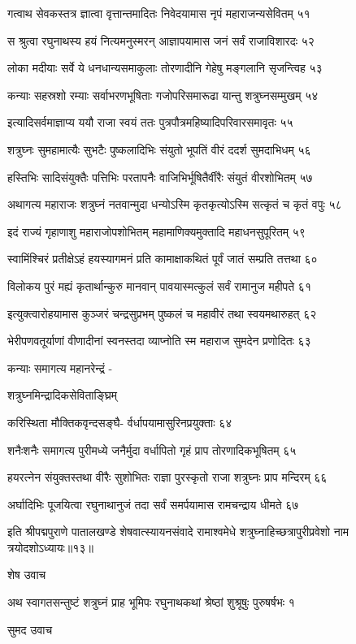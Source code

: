 गत्वाथ सेवकस्तत्र ज्ञात्वा वृत्तान्तमादितः
निवेदयामास नृपं महाराजन्यसेवितम् ५१

स श्रुत्वा रघुनाथस्य हयं नित्यमनुस्मरन्
आज्ञापयामास जनं सर्वं राजाविशारदः ५२

लोका मदीयाः सर्वे ये धनधान्यसमाकुलाः
तोरणादीनि गेहेषु मङ्गलानि सृजन्त्विह ५३

कन्याः सहस्रशो रम्याः सर्वाभरणभूषिताः
गजोपरिसमारूढा यान्तु शत्रुघ्नसम्मुखम् ५४

इत्यादिसर्वमाज्ञाप्य ययौ राजा स्वयं ततः
पुत्रपौत्रमहिष्यादिपरिवारसमावृतः ५५

शत्रुघ्नः सुमहामात्यैः सुभटैः पुष्कलादिभिः
संयुतो भूपतिं वीरं ददर्श सुमदाभिधम् ५६

हस्तिभिः सादिसंयुक्तैः पत्तिभिः परतापनैः
वाजिभिर्भूषितैर्वीरैः संयुतं वीरशोभितम् ५७

अथागत्य महाराजः शत्रुघ्नं नतवान्मुदा
धन्योऽस्मि कृतकृत्योऽस्मि सत्कृतं च कृतं वपुः ५८

इदं राज्यं गृहाणाशु महाराजोपशोभितम्
महामाणिक्यमुक्तादि महाधनसुपूरितम् ५९

स्वामिंश्चिरं प्रतीक्षेऽहं हयस्यागमनं प्रति
कामाक्षाकथितं पूर्वं जातं सम्प्रति तत्तथा ६०

विलोकय पुरं मह्यं कृतार्थान्कुरु मानवान्
पावयास्मत्कुलं सर्वं रामानुज महीपते ६१

इत्युक्त्वारोहयामास कुञ्जरं चन्द्रसुप्रभम्
पुष्कलं च महावीरं तथा स्वयमथारुहत् ६२

भेरीपणवतूर्याणां वीणादीनां स्वनस्तदा
व्याप्नोति स्म महाराज सुमदेन प्रणोदितः ६३

कन्याः समागत्य महानरेन्द्रं -

शत्रुघ्नमिन्द्रादिकसेविताङ्घ्रिम्

करिस्थिता मौक्तिकवृन्दसङ्घै-
र्वर्धापयामासुरिनप्रयुक्ताः ६४

शनैःशनैः समागत्य पुरीमध्ये जनैर्मुदा
वर्धापितो गृहं प्राप तोरणादिकभूषितम् ६५

हयरत्नेन संयुक्तस्तथा वीरैः सुशोभितः
राज्ञा पुरस्कृतो राजा शत्रुघ्नः प्राप मन्दिरम् ६६

अर्घादिभिः पूजयित्वा रघुनाथानुजं तदा
सर्वं समर्पयामास रामचन्द्राय धीमते ६७

इति श्रीपद्मपुराणे पातालखण्डे शेषवात्स्यायनसंवादे रामाश्वमेधे शत्रुघ्नाहिच्छत्रापुरीप्रवेशो नाम त्रयोदशोऽध्यायः॥१३॥


शेष उवाच

अथ स्वागतसन्तुष्टं शत्रुघ्नं प्राह भूमिपः
रघुनाथकथां श्रेष्ठां शुश्रूषुः पुरुषर्षभः १

सुमद उवाच


